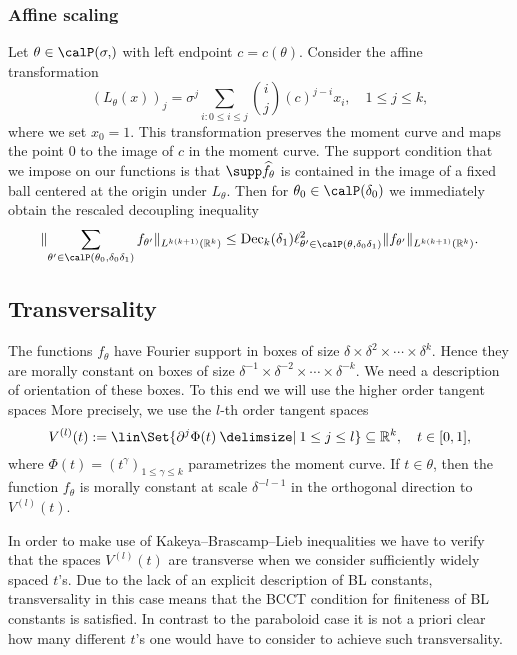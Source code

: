 \subsubsection{Affine scaling}
\label{sec:scaling}
Let $\theta \in \Part[\sigma]$ with left endpoint $c=c(\theta)$.
Consider the affine transformation
\begin{equation}
\label{eq:affine-scaling:space}
(L_{\theta}(x))_{j} =
\sigma^{j} \sum_{i : 0 \leq i \leq j} \binom{i}{j} (c)^{j-i} x_{i},
\quad
1 \leq j \leq k,
\end{equation}
where we set $x_{0}=1$.
This transformation preserves the moment curve and maps the point $0$ to the image of $c$ in the moment curve.
The support condition that we impose on our functions is that $\supp \widehat{f_{\theta}}$ is contained in the image of a fixed ball centered at the origin under $L_{\theta}$.
Then for $\theta_{0} \in \Part{\delta_{0}}$ we immediately obtain the rescaled decoupling inequality
\[
\norm{ \sum_{\theta' \in \Part[\theta_{0}]{\delta_{0}\delta_{1}}} f_{\theta'} }_{L^{k(k+1)}(\R^{k})}
\leq
\Dec_{k}(\delta_{1}) \ell^{2}_{\theta' \in \Part[\theta]{\delta_{0}\delta_{1}}} \norm{ f_{\theta'} }_{L^{k(k+1)}(\R^{k})}.
\]

\subsection{Transversality}
\label{sec:transversality}
The functions $f_{\theta}$ have Fourier support in boxes of size $\delta \times \delta^{2} \times \dotsm \times \delta^{k}$.
Hence they are morally constant on boxes of size $\delta^{-1} \times \delta^{-2} \times \dotsm \times \delta^{-k}$.
We need a description of orientation of these boxes.
To this end we will use the higher order tangent spaces
More precisely, we use the $l$-th order tangent spaces
\begin{equation}\label{order_tangent}
V^{(l)}(t):=\lin \Set{\partial^{j} \Phi(t) \given 1 \leq j \leq l} \subseteq \R^{k},
\quad t\in [0, 1],
\end{equation}
where $\Phi(t) = (t^{\gamma})_{1\leq \gamma\leq k}$ parametrizes the moment curve.
If $t\in\theta$, then the function $f_{\theta}$ is morally constant at scale $\delta^{-l-1}$ in the orthogonal direction to $V^{(l)}(t)$.

In order to make use of Kakeya--Brascamp--Lieb inequalities we have to verify that the spaces $V^{(l)}(t)$ are transverse when we consider sufficiently widely spaced $t$'s.
Due to the lack of an explicit description of BL constants, transversality in this case means that the BCCT condition for finiteness of BL constants is satisfied.
In contrast to the paraboloid case it is not a priori clear how many different $t$'s one would have to consider to achieve such transversality.

